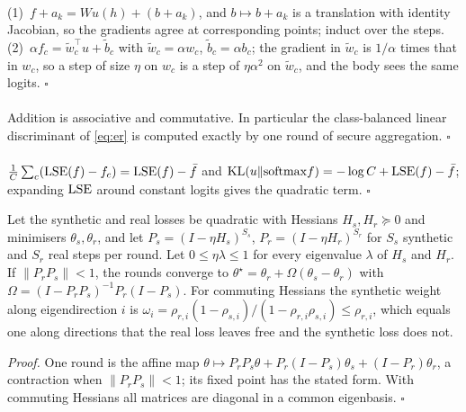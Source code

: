\paragraph{} (1)~$f+a_k=Wu(h)+(b+a_k)$, and $b\mapsto b+a_k$ is a translation with identity
Jacobian, so the gradients agree at corresponding points; induct over the steps. (2)~$\alpha f_c=\tilde w_c^\top
u+\tilde b_c$ with $\tilde w_c=\alpha w_c$, $\tilde b_c=\alpha b_c$; the gradient in $\tilde w_c$ is $1/\alpha$ times
that in $w_c$, so a step of size $\eta$ on $w_c$ is a step of $\eta\alpha^2$ on $\tilde w_c$, and the body sees the
same logits. \hfill$\square$

\paragraph{} Addition is associative and commutative. In particular the class-balanced linear
discriminant of \cref{eq:er} is computed exactly by one round of secure aggregation. \hfill$\square$

\paragraph{} $\frac1C\sum_c(\mathrm{LSE}(f)-f_c)=\mathrm{LSE}(f)-\bar f$ and
$\mathrm{KL}(u\|\mathrm{softmax}f)=-\log C+\mathrm{LSE}(f)-\bar f$; expanding $\mathrm{LSE}$ around constant logits gives the quadratic term.
\hfill$\square$

\begin{lemma}\label{prop:alternation}
Let the synthetic and real losses be quadratic with Hessians $H_s,H_r\succeq0$ and minimisers $\theta_s,\theta_r$, and
let $P_s=(I-\eta H_s)^{S_s}$, $P_r=(I-\eta H_r)^{S_r}$ for $S_s$ synthetic and $S_r$ real steps per round. Let $0\le\eta\lambda\le1$ for every eigenvalue $\lambda$ of $H_s$ and $H_r$. If
$\|P_rP_s\|<1$, the rounds converge to $\theta^\star=\theta_r+\Omega(\theta_s-\theta_r)$ with
$\Omega=(I-P_rP_s)^{-1}P_r(I-P_s)$. For commuting Hessians the synthetic weight along eigendirection $i$ is
$\omega_i=\rho_{r,i}(1-\rho_{s,i})/(1-\rho_{r,i}\rho_{s,i})\le\rho_{r,i}$, which equals one along directions that the real loss
leaves free and the synthetic loss does not.
\end{lemma}
\emph{Proof.} One round is the affine map $\theta\mapsto P_rP_s\theta+P_r(I-P_s)\theta_s+(I-P_r)\theta_r$, a contraction
when $\|P_rP_s\|<1$; its fixed point has the stated form. With commuting Hessians all matrices are diagonal in a common
eigenbasis. \hfill$\square$

